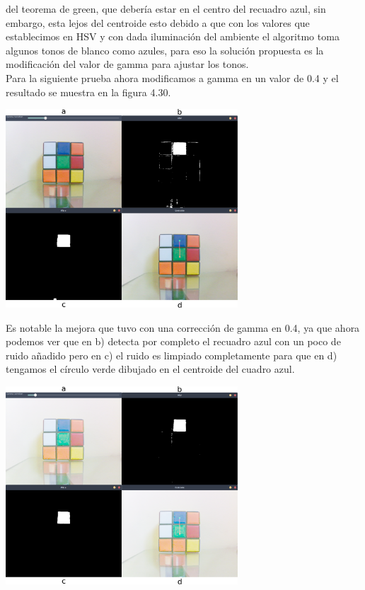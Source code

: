 del teorema de green, que debería estar en el centro del recuadro azul, sin embargo, esta lejos del centroide esto debido a que con
los valores que establecimos en HSV y con dada iluminación del ambiente el algoritmo toma algunos tonos de blanco como azules,
para eso la solución propuesta es la modificación del valor de gamma para ajustar los tonos.\\
Para la siguiente prueba ahora modificamos a gamma en un valor de 0.4 y el resultado se muestra en la figura 4.30.
\begin{center}
	\includegraphics[width=0.65\textwidth]{Contenido/Cuerpo/Capitulo4/Fig26.eps}
	\label{Fig9}
\end{center}
Es notable la mejora que tuvo con una corrección de gamma en 0.4, ya que ahora podemos ver que en b) detecta por completo el
recuadro azul con un poco de ruido añadido pero en c) el ruido es limpiado completamente para que en d) tengamos el círculo verde
dibujado en el centroide del cuadro azul.
\begin{center}
	\includegraphics[width=0.65\textwidth]{Contenido/Cuerpo/Capitulo4/Fig27.eps}
	\label{Fig9}
\end{center}
